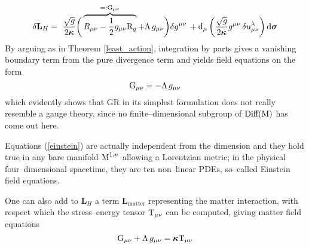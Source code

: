 $$
    \delta\mathbf{L}_H=\,\,\frac{\sqrt{g}}{2\boldsymbol{\kappa}}\bigg(\overbrace{R_{\mu\nu}-\frac{1}{2}g_{\mu\nu} \text{\normalfont R}_g}^{=:\text{\normalfont G}_{\mu\nu}}+\Lambda\,g_{\mu\nu}\bigg)\delta g^{\mu\nu}\,+\text{\normalfont d}_\mu\left(\frac{\sqrt{g}}{2\boldsymbol{\kappa}}g^{\mu\nu}\,\delta u^\lambda_{\mu\nu}\right)\text{\normalfont d}\boldsymbol{\sigma}
$$
By arguing as in Theorem \ref{least_action}, integration by parts gives a vanishing boundary term from the pure divergence term and yields field equations on the form
\begin{equation}\label{einstein}
    \text{\normalfont G}_{\mu\nu}=-\Lambda\,g_{\mu\nu}
\end{equation}
which evidently shows that GR in its simplest formulation does not really resemble a gauge theory, since no finite--dimensional subgroup of $\text{\normalfont Diff}(\text{\normalfont M})$ has come out here. %

Equations (\ref{einstein}) are actually independent from the dimension and they hold true in any bare manifold $\text{\normalfont M}^{1,n}$ allowing a Lorentzian metric; in the physical four--dimensional spacetime, they are ten non--linear PDEs, so--called Einstein field equations.

{One can also add to $\mathbf{L}_H$ a term $\mathbf{L}_{\text{matter}}$ representing the matter interaction, with respect which the stress--energy tensor $\text{\normalfont T}_{\mu\nu}$ can be computed, giving matter field equations
\begin{equation}\label{matter_einstein}
    \text{\normalfont G}_{\mu\nu}+\Lambda \,g_{\mu\nu}=\boldsymbol{\kappa}\text{\normalfont T}_{\mu\nu}
\end{equation}}

